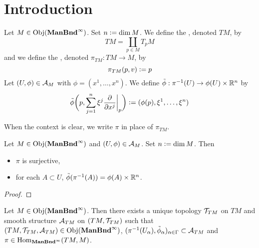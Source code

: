 \documentclass{book}
\begin{document}
\section{Introduction}

\begin{defn}
	Let $M \in \operatorname{Obj}(\operatorname*{\text{\textbf{ManBnd}}^{\infty}})$. Set $n \vcentcolon= \dim M$. We define the , denoted $TM$, by  
	$$TM = \coprod_{p \in M} T_p M $$ 
	and we define the , denoted $\pi_{TM}: TM \rightarrow M$, by 
	$$\pi_{TM}(p, v) \vcentcolon= p$$
	Let $(U, \phi) \in \mathcal{A}_M$ with $\phi = (x^1, \ldots, x^n)$. We define $\tilde{\phi}: \pi^{-1}(U) \rightarrow \phi(U) \times \mathbb{R}^n$ by 
	$$\tilde{\phi} \bigg(p, \sum_{j=1}^n \xi^j \frac{\partial}{\partial x^j} \bigg|_p \bigg) \vcentcolon= (\phi(p), \xi^1, \ldots, \xi^n)$$ 
\end{defn}

\begin{note}
	When the context is clear, we write $\pi$ in place of $\pi_{TM}$.
\end{note}

\begin{ex}
	Let $M \in \operatorname{Obj}(\operatorname*{\text{\textbf{ManBnd}}^{\infty}})$ and $(U, \phi) \in \mathcal{A}_M$. Set $n \vcentcolon= \dim M$. Then
	\begin{itemize}
		\item $\pi$ is surjective,
		\item for each $A \subset U$, $\tilde{\phi}(\pi^{-1}(A)) = \phi(A) \times \mathbb{R}^n$.
	\end{itemize}
\end{ex}

\begin{proof}
\end{proof}


\begin{ex}
	Let $M \in \operatorname{Obj}(\operatorname*{\text{\textbf{ManBnd}}^{\infty}})$. Then there exists a unique topology $\mathcal{T}_{TM}$ on $TM$ and smooth structure $\mathcal{A}_{TM}$ on $(TM, \mathcal{T}_{TM})$ such that $(TM, \mathcal{T}_{TM}, \mathcal{A}_{TM}) \in \operatorname{Obj}(\operatorname*{\text{\textbf{ManBnd}}^{\infty}})$,  $(\pi^{-1}(U_{\alpha}), \tilde{\phi}_{\alpha})_{\alpha \in \Gamma} \subset \mathcal{A}_{TM}$ and $\pi \in \operatorname{Hom}_{\operatorname*{\text{\textbf{ManBnd}}^{\infty}}}(TM, M)$. 
\end{ex}
\end{document}
